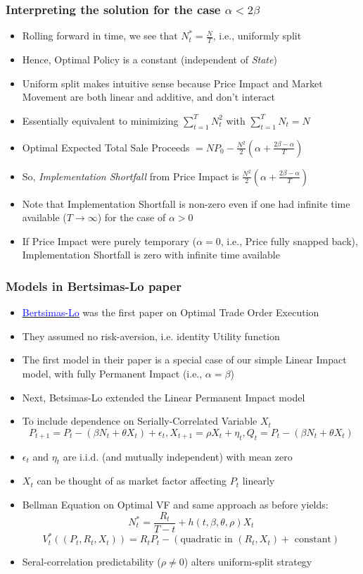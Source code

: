 \documentclass[handout]{beamer}
\begin{document}
\begin{frame}
\frametitle{Interpreting the solution for the case $\alpha < 2\beta$}
\pause
\begin{itemize}[<+->]
\item Rolling forward in time, we see that $N^*_t = \frac N T$, i.e., uniformly split
\item Hence, Optimal Policy is a constant (independent of {\em State})
\item Uniform split makes intuitive sense because Price Impact and Market Movement are both linear and additive, and don't interact
\item Essentially equivalent to minimizing $\sum_{t=1}^T N_t^2$ with $\sum_{t=1}^T N_t = N$
\item Optimal Expected Total Sale Proceeds $= NP_0 - \frac {N^2} 2 (\alpha + \frac {2\beta - \alpha} T)$
\item So, {\em Implementation Shortfall} from Price Impact is $\frac {N^2} 2 (\alpha + \frac {2\beta - \alpha} T)$
\item Note that Implementation Shortfall is non-zero even if one had infinite time available ($T\rightarrow \infty$) for the case of $\alpha > 0$
\item If Price Impact were purely temporary ($\alpha = 0$, i.e., Price fully snapped back), Implementation Shortfall is zero with infinite time available
\end{itemize}
\end{frame}

\begin{frame}
\frametitle{Models in Bertsimas-Lo paper}
\pause
\begin{itemize}[<+->]
\item \href{http://alo.mit.edu/wp-content/uploads/2015/06/Optimal-Control-of-Execution-Costs.pdf}{\underline{\textcolor{blue}{Bertsimas-Lo}}} was the first paper on Optimal Trade Order Execution
\item They assumed no risk-aversion, i.e. identity Utility function
\item The first model in their paper is a special case of our simple Linear Impact model, with fully Permanent Impact (i.e., $\alpha = \beta$)
\item Next, Betsimas-Lo extended the Linear Permanent Impact model
\item To include dependence on Serially-Correlated Variable $X_t$
$$P_{t+1} = P_t - (\beta N_t + \theta X_t) + \epsilon_t, X_{t+1} = \rho X_t + \eta_t, Q_t = P_t - (\beta N_t + \theta X_t)$$
\item $\epsilon_t$ and $\eta_t$ are i.i.d. (and mutually independent) with mean zero
\item $X_t$ can be thought of as market factor affecting $P_t$ linearly
\item Bellman Equation on Optimal VF and same approach as before yields:
$$N^*_t = \frac {R_t} {T-t} + h(t, \beta, \theta, \rho) X_t$$
$$V^*_t((P_t,R_t,X_t)) = R_tP_t - (\mbox{quadratic in } (R_t,X_t) + \mbox{ constant})$$
\item Seral-correlation predictability ($\rho \neq 0$) alters uniform-split strategy
\end{itemize}
\end{frame}
\end{document}
